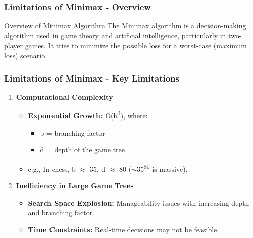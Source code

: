 \documentclass[aspectratio=169]{beamer}
\begin{document}
\begin{frame}[fragile]
    \frametitle{Limitations of Minimax - Overview}
    \begin{block}{Overview of Minimax Algorithm}
        The Minimax algorithm is a decision-making algorithm used in game theory and artificial intelligence, particularly in two-player games. It tries to minimize the possible loss for a worst-case (maximum loss) scenario.
    \end{block}
\end{frame}

\begin{frame}[fragile]
    \frametitle{Limitations of Minimax - Key Limitations}
    \begin{enumerate}
        \item \textbf{Computational Complexity}
        \begin{itemize}
            \item \textbf{Exponential Growth:} O(b\textsuperscript{d}), where:
            \begin{itemize}
                \item b = branching factor
                \item d = depth of the game tree
            \end{itemize}
            \item e.g., In chess, b $\approx$ 35, d $\approx$ 80 ($\sim$35\textsuperscript{80} is massive).
        \end{itemize}

        \item \textbf{Inefficiency in Large Game Trees}
        \begin{itemize}
            \item \textbf{Search Space Explosion:} Manageability issues with increasing depth and branching factor.
            \item \textbf{Time Constraints:} Real-time decisions may not be feasible.
        \end{itemize}
    \end{enumerate}
\end{frame}
\end{document}
